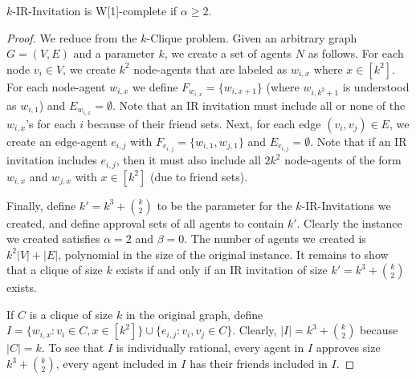 \begin{theorem} \label{SIP:thm:IR_invitation_alpha2}
	$k$-IR-Invitation is W[1]-complete if $\alpha \geq 2$.
\end{theorem}
\begin{proof}	We reduce from the $k$-Clique problem.
	Given an arbitrary graph $G = (V, E)$ and a parameter $k$, we create a set of agents $N$ as follows. 
	For each node $v_i\in V$, we create $k^2$ node-agents that are labeled as $w_{i,x}$ where $x \in [k^2]$. 
	For each node-agent $w_{i,x}$ we define $F_{w_{i,x}} = \{w_{i,x+1}\}$ (where $w_{i,k^2+1}$ is understood as $w_{i,1}$) and $E_{w_{i,x}} = \emptyset$. 
	Note that an IR invitation must include all or none of the $w_{i,x}$'s for each $i$ because of their friend sets.
	Next, for each edge $(v_i, v_j) \in E$, we create an edge-agent $e_{i,j}$ with $F_{e_{i,j}} = \{w_{i,1}, w_{j,1}\}$ and $E_{e_{i,j}} = \emptyset$. 
	Note that if an IR invitation includes $e_{i,j}$, then it must also include all $2k^2$ node-agents of the form $w_{i,x}$ and $w_{j,x}$ with $x\in[k^2]$ (due to friend sets).
	
	Finally, define $k' = k^3 + \binom{k}{2}$ to be the parameter for the $k$-IR-Invitations we created, and define approval sets of all agents to contain $k'$. 
	Clearly the instance we created satisfies $\alpha = 2$ and $\beta = 0$. 
	The number of agents we created is $k^2|V| + |E|$, polynomial in the size of the original instance.
	It remains to show that a clique of size $k$ exists if and only if an IR invitation of size $k' = k^3 + \binom{k}{2}$ exists.

	If $C$ is a clique of size $k$ in the original graph, define $I = \{w_{i, x}: v_i\in C, x\in[k^2]\} \cup \{e_{i,j} : v_i, v_j \in C\}$. Clearly, $|I| = k^3 + \binom{k}{2}$ because $|C| = k$. To see that $I$ is individually rational, every agent in $I$ approves size $k^3 + \binom{k}{2}$, every agent included in $I$ has their friends included in $I$.  


\end{proof}
